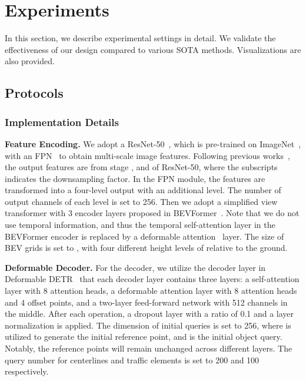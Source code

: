 \section{Experiments}
\label{sec:exp}

In this section, we describe experimental settings in detail.
We validate the effectiveness of our design compared to various SOTA methods.
Visualizations are also provided.

\subsection{Protocols}
\label{sec:exp-protocal}

\subsubsection{Implementation Details}

\textbf{Feature Encoding.}
We adopt a ResNet-50~\cite{he2016resnet}, which is pre-trained on ImageNet~\cite{deng2009imagenet}, with an FPN~\cite{lin2017feature} to obtain multi-scale image features. 
Following previous works~\cite{zhu2020deformabledetr,li2022bevformer}, the output features are from stage ,  and  of ResNet-50, where the subscripts  indicates the downsampling factor.
In the FPN module, the features are transformed into a four-level output with an additional  level. 
The number of output channels of each level is set to 256. 
Then we adopt a simplified view transformer with 3 encoder layers proposed in BEVFormer~\cite{li2022bevformer}. 
Note that we do not use temporal information, and thus the temporal self-attention layer in the BEVFormer encoder is replaced by a deformable attention~\cite{zhu2020deformabledetr} layer.
The size of BEV grids is set to , with four different height levels of  relative to the ground. 



\smallskip
\noindent
\textbf{Deformable Decoder.}
For the decoder, we utilize the decoder layer in Deformable DETR~\cite{zhu2020deformabledetr} that each decoder layer contains three layers: 
a self-attention layer with 8 attention heads, 
a deformable attention layer with 8 attention heads and 4 offset points,
and a two-layer feed-forward network with 512 channels in the middle. 
After each operation, a dropout layer with a ratio of 0.1 and a layer normalization is applied. 
The dimension of initial queries  is set to 256, where  is utilized to generate the initial reference point, and  is the initial object query.
Notably, the reference points will remain unchanged across different layers.
The query number for centerlines and traffic elements is set to 200 and 100 respectively.


